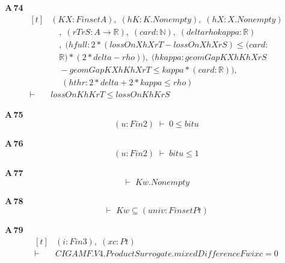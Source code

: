 \noindent\textbf{A\,74}\quad{}
{\footnotesize\[ \begin{aligned}[t]
&(\mathit{K} \mathit{X} : \mathit{Finset} \mathit{A}),\; (\mathit{hK} : \mathit{K}.\mathit{Nonempty}),\; (\mathit{hX} : \mathit{X}.\mathit{Nonempty})\\
&\quad ,\; (\mathit{rT} \mathit{rS} : \mathit{A} \to \mathbb{R} ),\; (\mathit{card} : \mathbb{N} ),\; (\mathit{delta} \mathit{rho} \mathit{kappa} : \mathbb{R} )\\
&\quad ,\; (\mathit{hfull} : 2 * (\mathit{lossOn} \mathit{X} \mathit{hX} \mathit{rT} - \mathit{lossOn} \mathit{X} \mathit{hX} \mathit{rS}) \leq (\mathit{card} :\\
&\quad \mathbb{R} ) * (2 * \mathit{delta} - \mathit{rho})),\; (\mathit{hkappa} : \mathit{geomGap} \mathit{K} \mathit{X} \mathit{hK} \mathit{hX} \mathit{rS}\\
&\quad - \mathit{geomGap} \mathit{K} \mathit{X} \mathit{hK} \mathit{hX} \mathit{rT} \leq \mathit{kappa} * (\mathit{card} : \mathbb{R} )),\\
&\quad \; (\mathit{hthr} : 2 * \mathit{delta} + 2 * \mathit{kappa} \leq \mathit{rho})\\
\vdash\;&\mathit{lossOn} \mathit{K} \mathit{hK} \mathit{rT} \leq \mathit{lossOn} \mathit{K} \mathit{hK} \mathit{rS}
\end{aligned} \]}

\noindent\textbf{A\,75}\quad{}
{\footnotesize\[ (\mathit{u} : \mathit{Fin} 2) \;\vdash\; 0 \leq \mathit{bit} \mathit{u} \]}

\noindent\textbf{A\,76}\quad{}
{\footnotesize\[ (\mathit{u} : \mathit{Fin} 2) \;\vdash\; \mathit{bit} \mathit{u} \leq 1 \]}

\noindent\textbf{A\,77}\quad{}
{\footnotesize\[ \vdash\; \mathit{Kw}.\mathit{Nonempty} \]}

\noindent\textbf{A\,78}\quad{}
{\footnotesize\[ \vdash\; \mathit{Kw} \subseteq (\mathit{univ} : \mathit{Finset} \mathit{Pt}) \]}

\noindent\textbf{A\,79}\quad{}
{\footnotesize\[ \begin{aligned}[t]
&(\mathit{i} : \mathit{Fin} 3),\; (\mathit{x} \mathit{c} : \mathit{Pt})\\
\vdash\;&\mathit{CIGAMF}.\mathit{V4}.\mathit{ProductSurrogate}.\mathit{mixedDifference} \mathit{Fw} \mathit{i} \mathit{x} \mathit{c} = 0
\end{aligned} \]}

